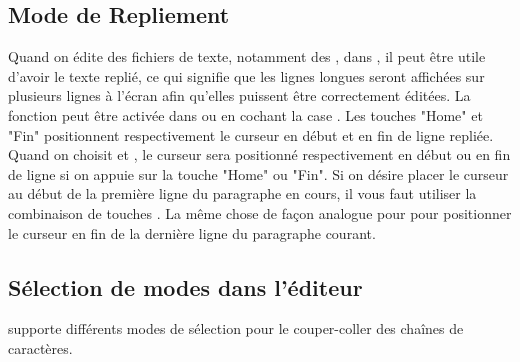 
\subsection{Mode de Repliement}

Quand on édite des fichiers de texte, notamment des , dans \codeblocks, il peut être utile d'avoir le texte replié, ce qui signifie que les lignes longues seront affichées sur plusieurs lignes à l'écran afin qu'elles puissent être correctement éditées. La fonction  peut être activée dans  ou en cochant la case . Les touches "Home" et "Fin" positionnent respectivement le curseur en début et en fin de ligne repliée. Quand on choisit  et , le curseur sera positionné respectivement en début ou en fin de ligne si on appuie sur la touche "Home" ou "Fin". Si on désire placer le curseur au début de la première ligne du paragraphe en cours, il vous faut utiliser la combinaison de touches . La même chose de façon analogue pour  pour positionner le curseur en fin de la dernière ligne du paragraphe courant.

\subsection{Sélection de modes dans l'éditeur}

\codeblocks supporte différents modes de sélection pour le couper-coller des chaînes de caractères.

